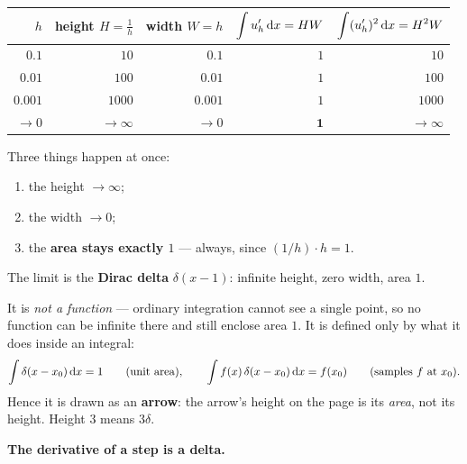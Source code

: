 \documentclass[11pt]{article}
\begin{document}
\begin{center}
\renewcommand{\arraystretch}{1.25}
\begin{tabular}{@{}rrrrr@{}}
\toprule
$h$ & height $H=\tfrac1h$ & width $W=h$
    & $\displaystyle\int u_{h}'\,\mathrm{d} x = HW$
    & $\displaystyle\int (u_{h}')^{2}\,\mathrm{d} x = H^{2}W$\\
\midrule
$0.1$    & $10$   & $0.1$   & $1$ & $10$\\
$0.01$   & $100$  & $0.01$  & $1$ & $100$\\
$0.001$  & $1000$ & $0.001$ & $1$ & $1000$\\
\midrule
$\to 0$  & $\to\infty$ & $\to 0$ & $\mathbf{1}$ & $\boldsymbol{\to\infty}$\\
\bottomrule
\end{tabular}
\end{center}

\medskip
Three things happen at once:
\begin{enumerate}[label=(\arabic*),leftmargin=2em,itemsep=1pt]
  \item the height $\to\infty$;
  \item the width $\to 0$;
  \item the \textbf{area stays exactly $1$} --- always, since $(1/h)\cdot h=1$.
\end{enumerate}

\begin{intuition}
The limit is the \textbf{Dirac delta} $\delta(x-1)$: infinite height, zero
width, area $1$.

It is \emph{not a function} --- ordinary integration cannot see a single point,
so no function can be infinite there and still enclose area $1$. It is defined
only by what it does inside an integral:
\[
  \int \delta(x-x_{0})\,\mathrm{d} x = 1
  \qquad\text{(unit area)},
  \qquad
  \int f(x)\,\delta(x-x_{0})\,\mathrm{d} x = f(x_{0})
  \qquad\text{(samples $f$ at $x_{0}$)} .
\]
Hence it is drawn as an \textbf{arrow}: the arrow's height on the page is its
\emph{area}, not its height. Height $3$ means $3\delta$.

\textbf{The derivative of a step is a delta.}
\end{intuition}
\end{document}
